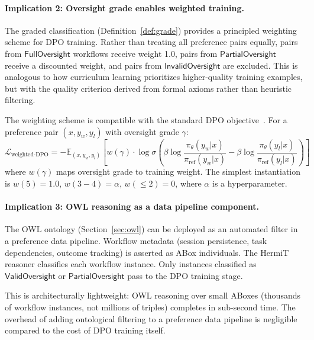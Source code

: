 \documentclass[11pt]{article}
\begin{document}
\paragraph{Implication 2: Oversight grade enables weighted training.}
The graded classification (Definition~\ref{def:grade}) provides a principled weighting scheme for DPO training.
Rather than treating all preference pairs equally, pairs from $\mathsf{FullOversight}$ workflows receive weight 1.0, pairs from $\mathsf{PartialOversight}$ receive a discounted weight, and pairs from $\mathsf{InvalidOversight}$ are excluded.
This is analogous to how curriculum learning prioritizes higher-quality training examples, but with the quality criterion derived from formal axioms rather than heuristic filtering.

The weighting scheme is compatible with the standard DPO objective~\citep{rafailov2023direct}.
For a preference pair $(x, y_w, y_l)$ with oversight grade $\gamma$:
\begin{equation}
  \mathcal{L}_{\text{weighted-DPO}} = -\mathbb{E}_{(x,y_w,y_l)} \left[ w(\gamma) \cdot \log \sigma \left( \beta \log \frac{\pi_\theta(y_w|x)}{\pi_{\text{ref}}(y_w|x)} - \beta \log \frac{\pi_\theta(y_l|x)}{\pi_{\text{ref}}(y_l|x)} \right) \right]
\end{equation}
where $w(\gamma)$ maps oversight grade to training weight.
The simplest instantiation is $w(5) = 1.0$, $w(3{-}4) = \alpha$, $w({\leq}2) = 0$, where $\alpha$ is a hyperparameter.

\paragraph{Implication 3: OWL reasoning as a data pipeline component.}
The OWL ontology (Section~\ref{sec:owl}) can be deployed as an automated filter in a preference data pipeline.
Workflow metadata (session persistence, task dependencies, outcome tracking) is asserted as ABox individuals.
The HermiT reasoner classifies each workflow instance.
Only instances classified as $\mathsf{ValidOversight}$ or $\mathsf{PartialOversight}$ pass to the DPO training stage.

This is architecturally lightweight: OWL reasoning over small ABoxes (thousands of workflow instances, not millions of triples) completes in sub-second time.
The overhead of adding ontological filtering to a preference data pipeline is negligible compared to the cost of DPO training itself.

\end{document}
